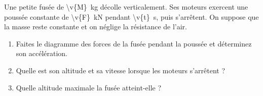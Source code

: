 Une petite fusée de \qty{\v{M}}{kg} décolle verticalement. Ses moteurs exercent une poussée constante de \qty{\v{F}}{kN} pendant \qty{\v{t}}{s}, puis s'arrêtent. On suppose que la masse reste constante et on néglige la résistance de l'air.

\begin{enumerate}[label=\alph*)]
    \item Faites le diagramme des forces de la fusée pendant la poussée et déterminez son accélération.
    \item Quelle est son altitude et sa vitesse lorsque les moteurs s'arrêtent ?
    \item Quelle altitude maximale la fusée atteint-elle ?
\end{enumerate}
